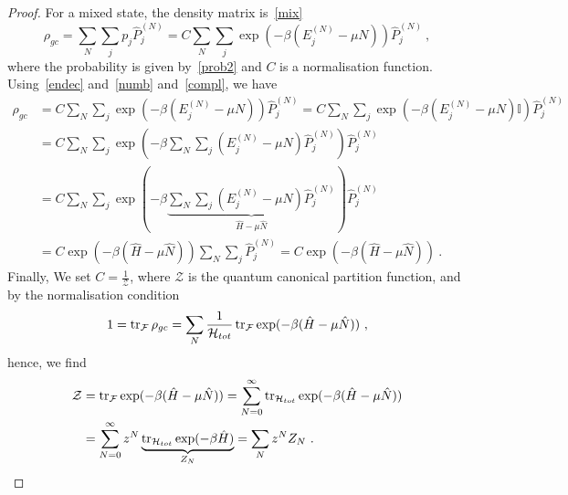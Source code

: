     \begin{proof}
        For a mixed state, the density matrix is~\eqref{mix}
        \begin{equation*}
            \rho_{gc} = \sum_N \sum_j p_j \hat P_j^{(N)} = C \sum_N \sum_j \exp(- \beta (E_j^{(N)} - \mu N)) \hat P_j^{(N)} ~,
        \end{equation*}
        where the probability is given by~\eqref{prob2} and $C$ is a normalisation function.
        Using~\eqref{endec} and~\eqref{numb} and~\eqref{compl}, we have
        \begin{equation*}
        \begin{aligned}
            \rho_{gc} & = C \sum_N \sum_j \exp(- \beta (E_j^{(N)} - \mu N)) \hat P_j^{(N)} = C \sum_N \sum_j \exp(- \beta (E_j^{(N)} - \mu N) \mathbb I) \hat P_j^{(N)} \\ & = C \sum_N \sum_j \exp(- \beta \sum_N \sum_j (E_j^{(N)} - \mu N)\hat P_j^{(N)}) \hat P_j^{(N)} \\ & = C \sum_N \sum_j \exp(- \beta \underbrace{\sum_N \sum_j (E_j^{(N)} - \mu N)\hat P_j^{(N)}}_{\hat H - \mu \hat N}) \hat P_j^{(N)} \\ & = C \exp(-\beta (\hat H - \mu \hat N )) \sum_N \sum_j \hat P_j^{(N)} = C \exp(-\beta (\hat H - \mu \hat N ))  ~.
        \end{aligned}
        \end{equation*} Finally, We set $C = \frac{1}{\mathcal Z}$, where $\mathcal Z$ is the quantum canonical partition function, and by the normalisation condition 
        \begin{equation*}
            1 = \operatorname{tr}_{\mathcal F} \rho_{gc} = \sum_N \frac{1}{\mathcal H_{tot}} \operatorname{tr}_{\mathcal F} \exp(- \beta (\hat H - \mu \hat N)) ~,
        \end{equation*}
        hence, we find
        \begin{equation*}
        \begin{aligned}
            \mathcal Z & = \operatorname{tr}_{\mathcal F} \exp(- \beta (\hat H - \mu \hat N)) = \sum_{N=0}^{\infty} \operatorname{tr}_{\mathcal H_{tot}} \exp(- \beta (\hat H - \mu \hat N)) \\ & = \sum_{N=0}^{\infty} z^N \underbrace{\operatorname{tr}_{\mathcal H_{tot}} \exp(- \beta \hat H)}_{Z_N} = \sum_N z^N Z_N ~.
        \end{aligned}
        \end{equation*}
    \end{proof}

